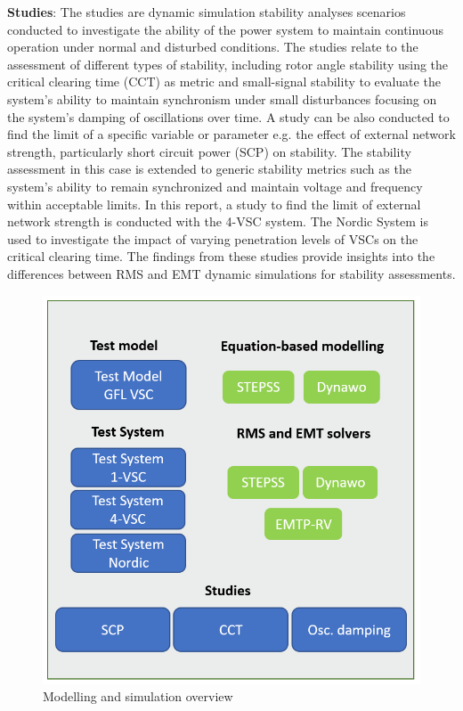 \documentclass{report}
\begin{document}
\textbf{Studies}: The studies are dynamic simulation stability analyses scenarios conducted to investigate the ability of the power system to maintain continuous operation under normal and disturbed conditions. The studies relate to the assessment of different types of stability, including rotor angle stability using the critical clearing time (CCT) as metric and small-signal stability to evaluate the system's ability to maintain synchronism under small disturbances focusing on the system's damping of oscillations over time. A study can be also conducted to find the limit of a specific variable or parameter e.g. the effect of external network strength, particularly short circuit power (SCP) on stability. The stability assessment in this case is extended to generic stability metrics such as the system's ability to remain synchronized and maintain voltage and frequency within acceptable limits. In this report, a study to find the limit of external network strength is conducted with the 4-VSC system. The Nordic System is used to investigate the impact of varying penetration levels of VSCs on the critical clearing time. The findings from these studies provide insights into the differences between RMS and EMT dynamic simulations for stability assessments.
\begin{figure}[h]
    \centering
    \includegraphics[width=0.8\linewidth]{Overview.PNG}
    \caption{Modelling and simulation overview}
    \label{fig:Overview}
\end{figure}
\end{document}
